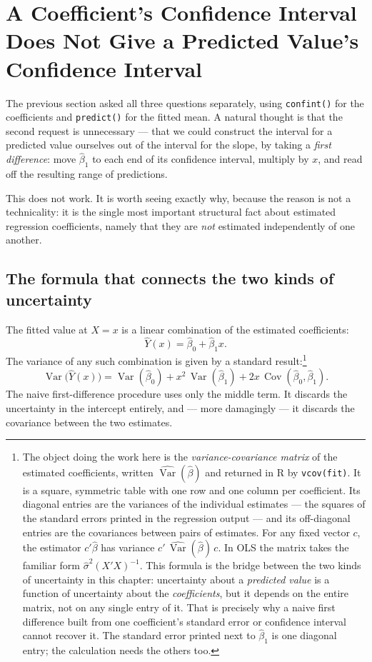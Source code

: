 \documentclass[11pt]{report}
\newcommand{\Var}{\operatorname{Var}}
\begin{document}
\section{A Coefficient's Confidence Interval Does Not Give a Predicted Value's Confidence Interval}

The previous section asked all three questions separately, using \texttt{confint()} for the coefficients and \texttt{predict()} for the fitted mean. A natural thought is that the second request is unnecessary --- that we could construct the interval for a predicted value ourselves out of the interval for the slope, by taking a \emph{first difference}: move \(\widehat{\beta}_1\) to each end of its confidence interval, multiply by \(x\), and read off the resulting range of predictions.

This does not work. It is worth seeing exactly why, because the reason is not a technicality: it is the single most important structural fact about estimated regression coefficients, namely that they are \emph{not} estimated independently of one another.

\subsection{The formula that connects the two kinds of uncertainty}

The fitted value at \(X=x\) is a linear combination of the estimated coefficients:
\[
\widehat{Y}(x)=\widehat{\beta}_0+\widehat{\beta}_1 x .
\]
The variance of any such combination is given by a standard result:\footnote{The object doing the work here is the \emph{variance-covariance matrix} of the estimated coefficients, written \(\widehat{\Var}(\widehat{\beta})\) and returned in R by \texttt{vcov(fit)}. It is a square, symmetric table with one row and one column per coefficient. Its diagonal entries are the variances of the individual estimates --- the squares of the standard errors printed in the regression output --- and its off-diagonal entries are the covariances between pairs of estimates. For any fixed vector \(c\), the estimator \(c'\widehat{\beta}\) has variance \(c'\,\widehat{\Var}(\widehat{\beta})\,c\). In OLS the matrix takes the familiar form \(\widehat{\sigma}^2(X'X)^{-1}\). This formula is the bridge between the two kinds of uncertainty in this chapter: uncertainty about a \emph{predicted value} is a function of uncertainty about the \emph{coefficients}, but it depends on the entire matrix, not on any single entry of it. That is precisely why a naive first difference built from one coefficient's standard error or confidence interval cannot recover it. The standard error printed next to \(\widehat{\beta}_1\) is one diagonal entry; the calculation needs the others too.}
\[
\Var\big(\widehat{Y}(x)\big)
=
\Var(\widehat{\beta}_0)
+
x^2\,\Var(\widehat{\beta}_1)
+
2x\,\operatorname{Cov}(\widehat{\beta}_0,\widehat{\beta}_1).
\]
The naive first-difference procedure uses only the middle term. It discards the uncertainty in the intercept entirely, and --- more damagingly --- it discards the covariance between the two estimates.
\end{document}
